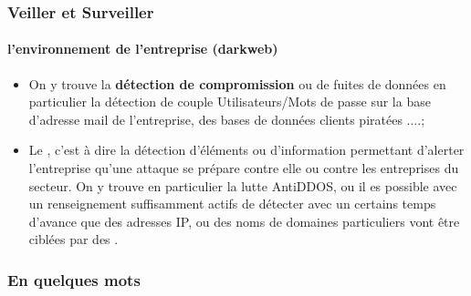\begin{frame}
\frametitle<presentation>{Veiller et Surveiller}
\framesubtitle<presentation>{l'environnement de l'entreprise (darkweb)}
\begin{itemize}
  \item On y trouve la\textbf{ détection de compromission} ou de fuites de données en particulier la détection de couple Utilisateurs/Mots de passe sur la base d'adresse mail de l'entreprise, des bases de données clients piratées ....;
  \item  Le\textbf{ }, c'est à dire la détection d'éléments ou d'information permettant d'alerter l'entreprise qu'une attaque se prépare contre elle ou contre les entreprises du secteur. On y trouve en particulier la lutte AntiDDOS, ou il es possible avec un renseignement suffisamment actifs de détecter avec un certains temps d'avance que des adresses IP, ou des noms de domaines particuliers vont être ciblées par des .
\end{itemize}
\end{frame}


\begin{frame}
\frametitle<presentation>{En quelques mots }
\end{frame}

